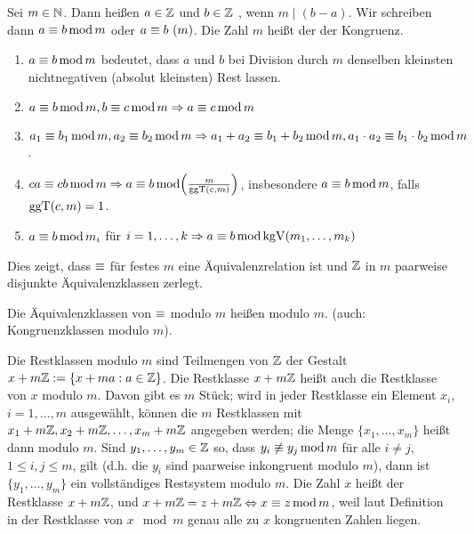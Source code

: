 \begin{defn}
	Sei $m \in \mathbb{N}$. 
	Dann heißen $a \in \mathbb{Z}$ und $b \in \mathbb{Z}$ , wenn $m \mid (b-a)$. 
	Wir schreiben dann $a \equiv b \operatorname{mod} m$ oder $a \equiv b \ (m)$. 
	Die Zahl $m$ heißt der  der Kongruenz. 
\end{defn}

\begin{folg}
\label{folg_1.1.2.2}
	\begin{enumerate}[(1)]
		\item $a \equiv b \operatorname{mod} m$ bedeutet, dass $a$ und $b$ bei Division durch $m$ denselben kleinsten nichtnegativen (absolut kleinsten) Rest lassen.
		\item $a \equiv b \operatorname{mod} m, b \equiv c \operatorname{mod} m \Rightarrow a \equiv c \operatorname{mod} m$
		\item $a_1 \equiv b_1 \operatorname{mod} m, a_2 \equiv b_2 \operatorname{mod} m \Rightarrow a_1 + a_2 \equiv b_1 + b_2 \operatorname{mod} m, a_1 \cdot a_2 \equiv b_1 \cdot b_2 \operatorname{mod} m$.
		\item $ca \kon cb \modu m \Rightarrow a \kon b \modu \enbrace*{\frac{m}{\ggT(c,m)}}$, insbesondere $a \equiv b \operatorname{mod} m$, falls $\operatorname{ggT}(c,m) = 1$.
		\item $a \equiv b \operatorname{mod} m_i$ für $i = 1, \dots, k \Rightarrow a \equiv b \operatorname{mod} \operatorname{kgV}(m_1,\dots,m_k)$
	\end{enumerate}
	Dies zeigt, dass $\equiv$ für festes $m$ eine Äquivalenzrelation ist und $\mathbb{Z}$ in $m$ paarweise disjunkte Äquivalenzklassen zerlegt.
\end{folg}

\begin{defn}[Restklasse]
	Die Äquivalenzklassen von $\equiv$ modulo $m$ heißen  modulo $m$. 
	(auch: Kongruenzklassen modulo $m$). 
\end{defn}

\begin{folg}
	Die Restklassen modulo $m$ sind Teilmengen von $\mathbb{Z}$ der Gestalt $x + m\mathbb{Z} := \{x + ma : a \in \mathbb{Z}\}$. 
	Die Restklasse $x + m\mathbb{Z}$ heißt auch die Restklasse von $x$ modulo $m$. 
	Davon gibt es $m$ Stück; wird in jeder Restklasse ein Element $x_i$,\linebreak $i = 1, \dots, m$ ausgewählt, können die $m$ Restklassen mit $x_1 + m\mathbb{Z}, x_2 + m\mathbb{Z}, \dots, x_m + m\mathbb{Z}$ angegeben werden; die Menge $\{x_1,\dots,x_m\}$ heißt dann  modulo $m$. 
	Sind $y_1, \dots, y_m \in \mathbb{Z}$ so, dass $y_i \not\equiv y_j \operatorname{mod} m$ für alle $i \neq j$, $1 \leq i,j \leq m$, gilt (d.h. die $y_i$ sind paarweise inkongruent modulo $m$), dann ist $\{y_1, \dots, y_m\}$ ein vollständiges Restsystem modulo $m$. 
	Die Zahl $x$ heißt  der Restklasse $x + m\mathbb{Z}$, und $x + m\mathbb{Z} = z + m\mathbb{Z} \Leftrightarrow x \equiv z \operatorname{mod} m$, weil laut Definition in der Restklasse von $x \mod m$ genau alle zu $x$ kongruenten Zahlen liegen. 
\end{folg}


